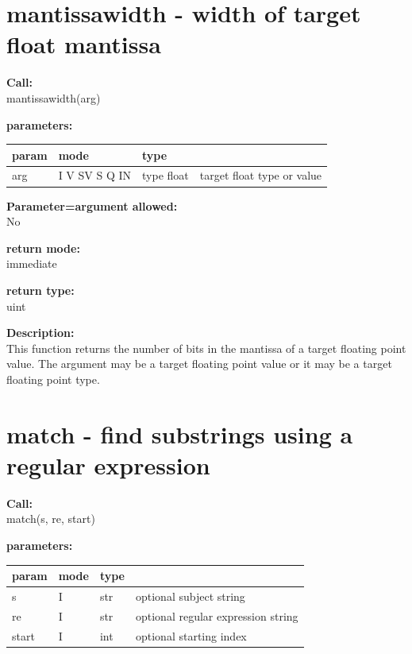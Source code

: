     \section{mantissawidth - width of target float mantissa}\label{sec:ifmantissawidth}
        
        {\bf Call:} \\
        mantissawidth(arg)
        
        {\bf parameters:} \\
        \begin{tabular}{| l | l | l | l |}
        \hline
        param  & mode & type & \\
        \hline \hline
        arg  & I V SV S Q IN & type float & target float type or value  \\ \hline
        \end{tabular}
        
        {\bf Parameter=argument allowed:} \\
        No
        
        {\bf return mode:} \\
        immediate

        {\bf return type:} \\
        uint
        
        {\bf Description:} \\
        This function returns the number of bits in the mantissa of
        a target floating point value. The argument may be a target floating
        point value or it may be a target floating point type.




       

    \section{match - find substrings using a regular expression}\label{sec:ifmatch}
        
        {\bf Call:} \\
        match(s, re, start)
        
        {\bf parameters:} \\
        \begin{tabular}{| l | l | l | l |}
        \hline
        param  & mode & type & \\
        \hline \hline
        s     & I & str & optional subject string               \\ \hline
        re    & I & str & optional regular expression string    \\ \hline
        start & I & int & optional starting index               \\ \hline
        \end{tabular}
        
